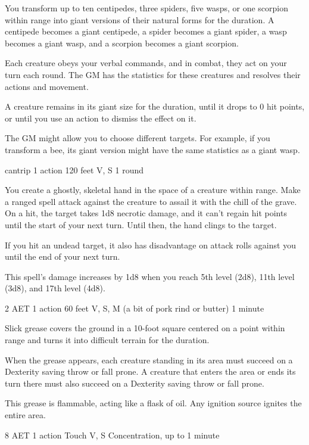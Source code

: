 You transform up to ten centipedes, three spiders, five wasps, or one scorpion within range into giant versions of their natural forms for the duration. A centipede becomes a giant centipede, a spider becomes a giant spider, a wasp becomes a giant wasp, and a scorpion becomes a giant scorpion.

Each creature obeys your verbal commands, and in combat, they act on your turn each round. The GM has the statistics for these creatures and resolves their actions and movement.

A creature remains in its giant size for the duration, until it drops to 0 hit points, or until you use an action to dismiss the effect on it.

The GM might allow you to choose different targets. For example, if you transform a bee, its giant version might have the same statistics as a giant wasp.


{cantrip}
{1 action}
{120 feet}
{V, S}
{1 round}

You create a ghostly, skeletal hand in the space of a creature within range. Make a ranged spell attack against the creature to assail it with the chill of the grave. On a hit, the target takes 1d8 necrotic damage, and it can't regain hit points until the start of your next turn. Until then, the hand clings to the target.

If you hit an undead target, it also has disadvantage on attack rolls against you until the end of your next turn.

This spell's damage increases by 1d8 when you reach 5th level (2d8), 11th level (3d8), and 17th level (4d8).


{2 AET}
{1 action}
{60 feet}
{V, S, M (a bit of pork rind or butter)}
{1 minute}

Slick grease covers the ground in a 10-foot square centered on a point within range and turns it into difficult terrain for the duration.

When the grease appears, each creature standing in its area must succeed on a Dexterity saving throw or fall prone. A creature that enters the area or ends its turn there must also succeed on a Dexterity saving throw or fall prone.

This grease is flammable, acting like a flask of oil. Any ignition source ignites the entire area.


{8 AET}
{1 action}
{Touch}
{V, S}
{Concentration, up to 1 minute}

